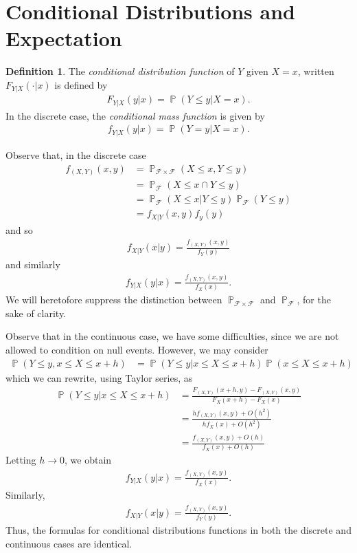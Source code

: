 \documentclass[12pt]{article}
\newcommand{\filter}{\mathcal{F}}
\DeclareMathOperator{\prob}{\mathbb{P}}
\theoremstyle{plain}
\theoremstyle{definition}
\newtheorem*{definition}{Definition}
\theoremstyle{remark}
\numberwithin{equation}{section}  %
\begin{document}
\section{Conditional Distributions and Expectation}
\begin{definition}
	The \emph{conditional distribution function} of $Y$ given $X = x$,
	written $F_{Y|X}(\cdot | x)$ is defined by
	\begin{align*}
		F_{Y|X}(y|x) = \prob (Y \le y | X = x).
	\end{align*}
	In the discrete case, the \emph{conditional mass function}
	is given by
	\begin{align*}
		f_{Y|X}(y|x) = \prob(Y = y | X = x).
	\end{align*}
\end{definition}
Observe that, in the discrete case
\begin{align*}
	f_{(X,Y)}(x,y)
	& = \prob_{\filter \times \filter}(X \le x, Y \le y)
	\\
	& = \prob_{\filter} (X \le x \cap Y \le y)
	\\
	& = \prob_{\filter}(X \le x | Y \le y) \prob_{\filter}(Y \le y)
	\\
	& = f_{X|Y}	(x,y) f_y(y)	
\end{align*}
and so
\begin{align*}
	f_{X|Y}(x|y) = \frac{f_{(X,Y)}(x,y)}{f_Y(y)}
\end{align*}
and similarly
\begin{align*}
	f_{Y|X}(y|x) = \frac{f_{(X,Y)}(x,y)}{f_X(x)}.
\end{align*}
We will heretofore suppress the distinction between $\prob_{\filter \times
\filter}$ and $\prob_{\filter}$, for the sake of clarity.

Observe that in
the continuous case, we have some difficulties,
since we are not allowed to condition on null events. However, we may consider
\begin{align*}
	\prob(Y \le y , x \le X \le x + h)
	& = \prob(Y \le y | x \le X \le x +h) \prob(x \le X \le x + h)
\end{align*}
which we can rewrite, using Taylor series, as
\begin{align*}
	\prob(Y \le y | x \le X \le x + h)
	& = \frac{F_{(X,Y)}(x+h,y ) - F_{(X,Y)}(x,y )}{F_X(x+h) - F_X(x)}
	\\
	& = \frac{hf_{(X,Y)}(x,y) + O(h^2)}{hf_X(x) + O(h^2)}
	\\
	& = \frac{f_{(X,Y)}(x,y) + O(h)}{f_X(x) + O(h)}
\end{align*}
Letting $h \to 0$, we obtain
\begin{align*}
	f_{Y|X}(y|x) = \frac{f_{(X,Y)}(x,y)}{f_X(x)}.
\end{align*}
Similarly, 
\begin{align*}
	f_{X|Y}(x|y) = \frac{f_{(X,Y)}(x,y)}{f_Y(y)}.
\end{align*}
Thus, the formulas for conditional distributions
functions in both the discrete and continuous cases are identical.
\end{document}
